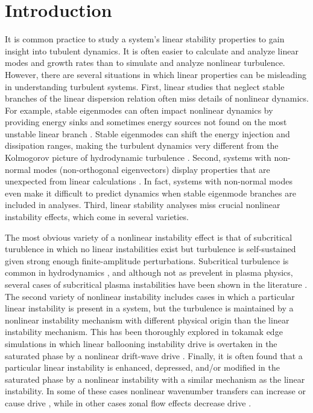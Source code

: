 \documentclass[showpacs,preprintnumbers,amsmath,amssymb,superscriptaddress]{revtex4}
\begin{document}
\section{Introduction}
It is common practice to study a system's linear stability properties to gain insight into tubulent dynamics. It is often easier to calculate and analyze linear modes and growth rates than
to simulate and analyze nonlinear turbulence. However, there are several situations in which linear properties can be misleading in understanding turbulent systems. First,
linear studies that neglect stable branches of the linear dispersion relation often miss details of nonlinear dynamics. For example, stable eigenmodes can often
impact nonlinear dynamics by providing energy sinks and sometimes energy sources not found on the most unstable linear branch
\cite{baver2002,terry2002,terry2006a,terry2006b,gatto2006,terry2009,hatch2009,kim2010,makwana2011,hatch2011}. Stable eigenmodes can shift
the energy injection and dissipation ranges, making the turbulent dynamics very different from the Kolmogorov picture of hydrodynamic turbulence \cite{Kolmogorov1941}.
Second, systems with non-normal modes (non-orthogonal eigenvectors) display properties that are unexpected from linear calculations \cite{kim2010,camargo1998}. 
In fact, systems with non-normal modes even make it difficult to predict dynamics
when stable eigenmode branches are included in analyses. Third, linear stability analyses miss crucial nonlinear instability effects, which come in several varieties. 

The most obvious variety of a nonlinear instability effect is that of subcritical turublence in which no linear instabilities exist but turbulence is self-sustained 
given strong enough finite-amplitude perturbations. Subcritical turbulence is common in hydrodynamics \cite{manneville2008}, and although not as prevelent in plasma physics,
several cases of subcritical plasma instabilities have been shown in the literature \cite{scott1990,scott1992,drake1995,nordman1993,waltz1985,itoh1996}.
The second variety of nonlinear instability includes cases in which a particular linear instability is present in a system, but the turbulence is maintained
by a nonlinear instability mechanism with different physical origin than the linear instability mechanism. This has been thoroughly explored in tokamak edge simulations in which
linear ballooning instability drive is overtaken in the saturated phase by a nonlinear drift-wave drive \cite{zeiler1996,zeiler1997,scott2002,scott2003,scott2005}.
Finally, it is often found that a particular linear instability is enhanced, depressed, and/or  modified in the saturated phase by a nonlinear instability with a similar mechanism 
as the linear instability. In some of these cases nonlinear wavenumber transfers can increase or cause drive \cite{biskamp1995,korsholm1999}, while in other cases zonal flow effects
decrease drive \cite{dimits2000,ernst2004}. 
\end{document}
